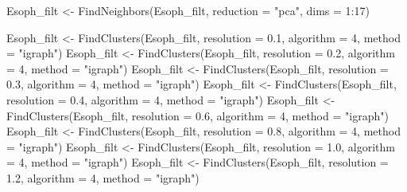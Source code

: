 \documentclass[
  letterpaper,
  DIV=11,
  numbers=noendperiod]{scrreprt}
\newenvironment{Shaded}{\begin{snugshade}}{\end{snugshade}}
\newcommand{\AttributeTok}[1]{\textcolor[rgb]{0.40,0.45,0.13}{#1}}
\newcommand{\DecValTok}[1]{\textcolor[rgb]{0.68,0.00,0.00}{#1}}
\newcommand{\FloatTok}[1]{\textcolor[rgb]{0.68,0.00,0.00}{#1}}
\newcommand{\FunctionTok}[1]{\textcolor[rgb]{0.28,0.35,0.67}{#1}}
\newcommand{\NormalTok}[1]{\textcolor[rgb]{0.00,0.23,0.31}{#1}}
\newcommand{\OtherTok}[1]{\textcolor[rgb]{0.00,0.23,0.31}{#1}}
\newcommand{\SpecialCharTok}[1]{\textcolor[rgb]{0.37,0.37,0.37}{#1}}
\newcommand{\StringTok}[1]{\textcolor[rgb]{0.13,0.47,0.30}{#1}}
\begin{document}
\begin{Shaded}
\begin{Highlighting}[]
\NormalTok{Esoph\_filt }\OtherTok{\textless{}{-}} \FunctionTok{FindNeighbors}\NormalTok{(Esoph\_filt, }\AttributeTok{reduction =} \StringTok{"pca"}\NormalTok{, }\AttributeTok{dims =} \DecValTok{1}\SpecialCharTok{:}\DecValTok{17}\NormalTok{)}

\NormalTok{Esoph\_filt }\OtherTok{\textless{}{-}} \FunctionTok{FindClusters}\NormalTok{(Esoph\_filt, }\AttributeTok{resolution =} \FloatTok{0.1}\NormalTok{, }\AttributeTok{algorithm =} \DecValTok{4}\NormalTok{, }\AttributeTok{method =} \StringTok{"igraph"}\NormalTok{) }
\NormalTok{Esoph\_filt }\OtherTok{\textless{}{-}} \FunctionTok{FindClusters}\NormalTok{(Esoph\_filt, }\AttributeTok{resolution =} \FloatTok{0.2}\NormalTok{, }\AttributeTok{algorithm =} \DecValTok{4}\NormalTok{, }\AttributeTok{method =} \StringTok{"igraph"}\NormalTok{) }
\NormalTok{Esoph\_filt }\OtherTok{\textless{}{-}} \FunctionTok{FindClusters}\NormalTok{(Esoph\_filt, }\AttributeTok{resolution =} \FloatTok{0.3}\NormalTok{, }\AttributeTok{algorithm =} \DecValTok{4}\NormalTok{, }\AttributeTok{method =} \StringTok{"igraph"}\NormalTok{) }
\NormalTok{Esoph\_filt }\OtherTok{\textless{}{-}} \FunctionTok{FindClusters}\NormalTok{(Esoph\_filt, }\AttributeTok{resolution =} \FloatTok{0.4}\NormalTok{, }\AttributeTok{algorithm =} \DecValTok{4}\NormalTok{, }\AttributeTok{method =} \StringTok{"igraph"}\NormalTok{) }
\NormalTok{Esoph\_filt }\OtherTok{\textless{}{-}} \FunctionTok{FindClusters}\NormalTok{(Esoph\_filt, }\AttributeTok{resolution =} \FloatTok{0.6}\NormalTok{, }\AttributeTok{algorithm =} \DecValTok{4}\NormalTok{, }\AttributeTok{method =} \StringTok{"igraph"}\NormalTok{) }
\NormalTok{Esoph\_filt }\OtherTok{\textless{}{-}} \FunctionTok{FindClusters}\NormalTok{(Esoph\_filt, }\AttributeTok{resolution =} \FloatTok{0.8}\NormalTok{, }\AttributeTok{algorithm =} \DecValTok{4}\NormalTok{, }\AttributeTok{method =} \StringTok{"igraph"}\NormalTok{) }
\NormalTok{Esoph\_filt }\OtherTok{\textless{}{-}} \FunctionTok{FindClusters}\NormalTok{(Esoph\_filt, }\AttributeTok{resolution =} \FloatTok{1.0}\NormalTok{, }\AttributeTok{algorithm =} \DecValTok{4}\NormalTok{, }\AttributeTok{method =} \StringTok{"igraph"}\NormalTok{) }
\NormalTok{Esoph\_filt }\OtherTok{\textless{}{-}} \FunctionTok{FindClusters}\NormalTok{(Esoph\_filt, }\AttributeTok{resolution =} \FloatTok{1.2}\NormalTok{, }\AttributeTok{algorithm =} \DecValTok{4}\NormalTok{, }\AttributeTok{method =} \StringTok{"igraph"}\NormalTok{)}
\end{Highlighting}
\end{Shaded}
\end{document}
